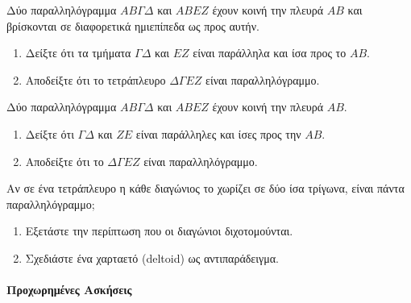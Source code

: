 \documentclass[11pt,a4paper,modern]{FFExercises}
\begin{document}
\askhsh Δύο παραλληλόγραμμα $ΑΒ\varGamma\Delta$ και $ΑΒΕΖ$ έχουν κοινή την πλευρά $ΑΒ$ και βρίσκονται σε διαφορετικά ημιεπίπεδα ως προς αυτήν.
\begin{enumerate}[label=\roman*)]
    \item Δείξτε ότι τα τμήματα $\varGamma\Delta$ και $ΕΖ$ είναι παράλληλα και ίσα προς το $ΑΒ$.
    \item Αποδείξτε ότι το τετράπλευρο $\Delta\varGamma Ε Ζ$ είναι παραλληλόγραμμο.
\end{enumerate}

\askhsh Δύο παραλληλόγραμμα $ΑΒ\varGamma\Delta$ και $ΑΒΕΖ$ έχουν κοινή την πλευρά $ΑΒ$.
\begin{enumerate}[label=\roman*)]
    \item Δείξτε ότι $\varGamma\Delta$ και $ΖΕ$ είναι παράλληλες και ίσες προς την $ΑΒ$.
    \item Αποδείξτε ότι το $\Delta\varGamma ΕΖ$ είναι παραλληλόγραμμο.
\end{enumerate}

\begin{center}
\end{center}

\askhsh Αν σε ένα τετράπλευρο η κάθε διαγώνιος το χωρίζει σε δύο ίσα τρίγωνα, είναι πάντα παραλληλόγραμμο;
\begin{enumerate}[label=\roman*)]
    \item Εξετάστε την περίπτωση που οι διαγώνιοι διχοτομούνται.
    \item Σχεδιάστε ένα χαρταετό (deltoid) ως αντιπαράδειγμα.
\end{enumerate}

\paragraph{Προχωρημένες Ασκήσεις}
\end{document}

